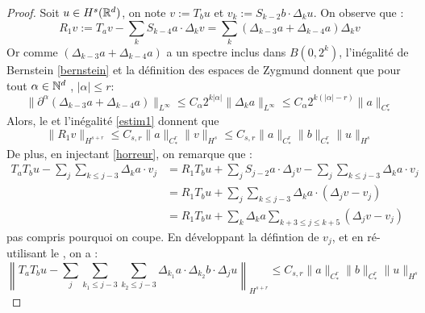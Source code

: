\documentclass[11pt,a4paper]{article}
\begin{document}
\begin{proof}
Soit $u\in H^s(\mathbb R^d)$, on note $v:=T_bu$ et $v_k:=S_{k-2}b\cdot\Delta_ku$. On observe que :
\begin{equation}\label{horreur}
R_1v:=T_av-\sum_k S_{k-4}a\cdot\Delta_kv = \sum_k (\Delta_{k-3}a + \Delta_{k-4}a)\Delta_kv
\end{equation}
Or comme $(\Delta_{k-3}a + \Delta_{k-4}a)$ a un spectre inclus dans $B(0,2^k)$, l'inégalité de Bernstein \eqref{bernstein} et la définition des espaces de Zygmund donnent que pour tout $\alpha \in \mathbb N^d$ , $|\alpha| \leq r$:
\begin{equation*}
\|\partial^\alpha(\Delta_{k-3}a + \Delta_{k-4}a)\|_{L^\infty} \leq C_\alpha 2^{k|\alpha|}\|\Delta_ka\|_{L^\infty} \leq C_\alpha 2^{k(|\alpha|-r)} \|a\|_{C^r_*}
\end{equation*}
Alors, le  et l'inégalité \eqref{estim1} donnent que 
\begin{equation*}
\|R_1v\|_{H^{s+r}} \leq C_{s,r} \|a\|_{C^r_*} \|v\|_{H^s} \leq C_{s,r} \|a\|_{C^r_*} \|b\|_{C^r_*} \|u\|_{H^s}
\end{equation*}
De plus, en injectant \eqref{horreur}, on remarque que :
\begin{align*}
T_aT_bu - \sum_j \sum_{k \leq j-3} \Delta_ka\cdot v_j &= R_1T_bu + \sum_j S_{j-2}a\cdot\Delta_jv - \sum_j \sum_{k \leq j-3} \Delta_ka\cdot v_j \\
&=R_1T_bu + \sum_j \sum_{k \leq j-3} \Delta_ka\cdot (\Delta_jv - v_j) \\
&=R_1T_bu + \sum_k \Delta_ka \sum_{k+3 \leq j \leq k+5} (\Delta_jv - v_j) 
\end{align*}
pas compris pourquoi on coupe. En développant la défintion de $v_j$, et en ré-utilisant le , on a :
\begin{equation}
\left\| T_aT_bu - \sum_j \sum_{k_1 \leq j-3} \sum_{k_2\leq j-3} \Delta_{k_1}a\cdot \Delta_{k_2}b \cdot \Delta_j u \right\|_{H^{s+r}} \leq C_{s,r} \|a\|_{C^r_*} \|b\|_{C^r_*} \|u\|_{H^s}
\end{equation}
\end{proof}




\newpage
\printbibliography[heading=bibintoc, title={Références}]
\end{document}
